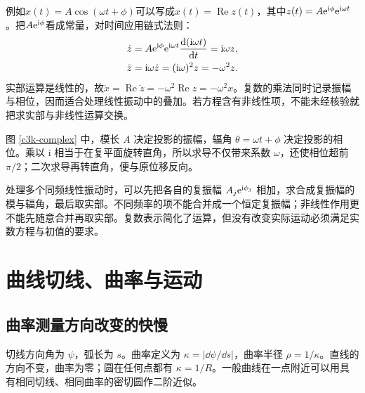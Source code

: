 例如$x(t)=A\cos(\omega t+\phi)$可以写成$x(t)=\operatorname{Re}z(t)$，其中$z(t)=A\mathrm e^{\mathrm i\phi}\mathrm e^{\mathrm i\omega t}$。把$A\mathrm e^{\mathrm i\phi}$看成常量，对时间应用链式法则：
\begin{align*}
\dot z&=A\mathrm e^{\mathrm i\phi}\mathrm e^{\mathrm i\omega t}
        \frac{\mathop{}\!\mathrm d(\mathrm i\omega t)}{\mathop{}\!\mathrm d t}
=\mathrm i\omega z,\\
\ddot z&=\mathrm i\omega\dot z=(\mathrm i\omega)^2z=-\omega^2z.
\end{align*}
实部运算是线性的，故$\ddot x=\operatorname{Re}\ddot z=-\omega^2\operatorname{Re}z=-\omega^2x$。复数的乘法同时记录振幅与相位，因而适合处理线性振动中的叠加。若方程含有非线性项，不能未经核验就把求实部与非线性运算交换。

图 \ref{c3k-complex} 中，模长 $A$ 决定投影的振幅，辐角 $\theta=\omega t+\phi$ 决定投影的相位。乘以 $\mathrm i$ 相当于在复平面旋转直角，所以求导不仅带来系数 $\omega$，还使相位超前 $\pi/2$；二次求导再转直角，便与原位移反向。

处理多个同频线性振动时，可以先把各自的复振幅 $A_j\mathrm e^{\mathrm i\phi_j}$ 相加，求合成复振幅的模与辐角，最后取实部。不同频率的项不能合并成一个恒定复振幅；非线性作用更不能先随意合并再取实部。复数表示简化了运算，但没有改变实际运动必须满足实数方程与初值的要求。

\section{曲线切线、曲率与运动}
\subsection{曲率测量方向改变的快慢}
切线方向角为 $\psi$，弧长为 $s$。曲率定义为 $\kappa=|\dd\psi/\dd s|$，曲率半径 $\rho=1/\kappa$。直线的方向不变，曲率为零；圆在任何点都有 $\kappa=1/R$。一般曲线在一点附近可以用具有相同切线、相同曲率的密切圆作二阶近似。

